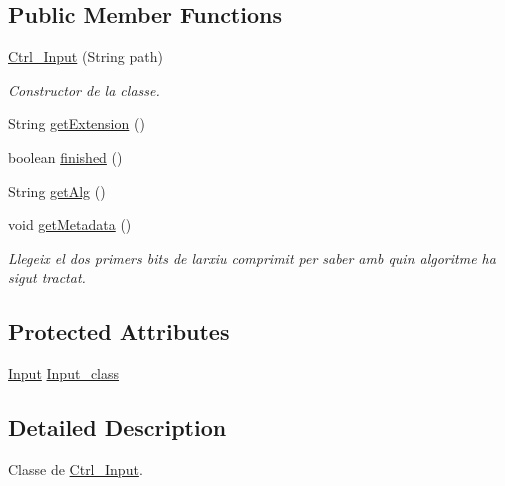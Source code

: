 \subsection*{Public Member Functions}
\begin{DoxyCompactItemize}
\item 
\hyperlink{classpersistencia_1_1input_1_1Ctrl__Input_a00f3fa14d0329d6e4b9ddbe39ada1258}{Ctrl\+\_\+\+Input} (String path)
\begin{DoxyCompactList}\small\item\em Constructor de la classe. \end{DoxyCompactList}\item 
String \hyperlink{classpersistencia_1_1input_1_1Ctrl__Input_a46d569c2f3ceb0ab6cf9900708b3316a}{get\+Extension} ()
\item 
boolean \hyperlink{classpersistencia_1_1input_1_1Ctrl__Input_a5a94d207dce0fd592b5ac17f55154d4f}{finished} ()
\item 
String \hyperlink{classpersistencia_1_1input_1_1Ctrl__Input_aa69f79fb581f6d80c5a9609148794570}{get\+Alg} ()
\item 
\mbox{\label{classpersistencia_1_1input_1_1Ctrl__Input_a46e05fce164a6803820c02565c1769c8}} 
void \hyperlink{classpersistencia_1_1input_1_1Ctrl__Input_a46e05fce164a6803820c02565c1769c8}{get\+Metadata} ()
\begin{DoxyCompactList}\small\item\em Llegeix el dos primers bits de l\textquotesingle{}arxiu comprimit per saber amb quin algoritme ha sigut tractat. \end{DoxyCompactList}\end{DoxyCompactItemize}
\subsection*{Protected Attributes}
\begin{DoxyCompactItemize}
\item 
\hyperlink{classpersistencia_1_1input_1_1Input}{Input} \hyperlink{classpersistencia_1_1input_1_1Ctrl__Input_affe3c91673d80b61450970a69fe84611}{Input\+\_\+class}
\end{DoxyCompactItemize}


\subsection{Detailed Description}
Classe de \hyperlink{classpersistencia_1_1input_1_1Ctrl__Input}{Ctrl\+\_\+\+Input}. 

